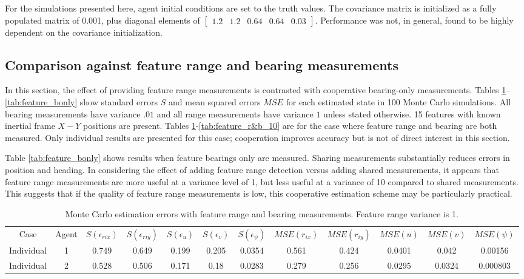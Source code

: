 \documentclass{aiaa-tc}
\begin{document}
For the simulations presented here, agent initial conditions are set to the truth values. The covariance matrix is initialized as a fully populated matrix of 0.001, plus diagonal elements of $\begin{bmatrix}1.2 & 1.2 & 0.64 & 0.64 & 0.03\end{bmatrix}$. Performance was not, in general, found to be highly dependent on the covariance initialization.

\subsection{Comparison against feature range and bearing measurements}\label{sec:subc1}

In this section, the effect of providing feature range measurements is contrasted with cooperative bearing-only measurements. Tables \ref{tab:feature_r&b}--\ref{tab:feature_bonly} show standard errors $S$ and mean squared errors $MSE$ for each estimated state in 100 Monte Carlo simulations. All bearing measurements have variance $.01$ and all range measurements have variance $1$ unless stated otherwise. 15 features with known inertial frame $X-Y$ positions are present. Tables \ref{tab:feature_r&b}-\ref{tab:feature_r&b_10} are for the case where feature range and bearing are both measured. Only individual results are presented for this case; cooperation improves accuracy but is not of direct interest in this section. 

Table \ref{tab:feature_bonly} shows results when feature bearings only are measured. Sharing measurements substantially reduces errors in position and heading. In considering the effect of adding feature range detection versus adding shared measurements, it appears that feature range measurements are more useful at a variance level of 1, but less useful at a variance of 10 compared to shared measurements. This suggests that if the quality of feature range measurements is low, this cooperative estimation scheme may be particularly practical.

\begin{table}[b!]
\scriptsize
\centering
\begin{tabular}{c|c|c|c|c|c|c|c|c|c|c|c|}
Case & Agent & $S(\epsilon_{rix})$ & $S(\epsilon_{riy})$ & $S(\epsilon_{u})$ & $S(\epsilon_{v})$ & $S(\epsilon_{\psi})$ & $MSE(r_{ix})$ & $MSE(r_{iy})$ & $MSE(u)$ & $MSE(v)$ & $MSE(\psi)$ \\
Individual & 1& 0.749& 0.649& 0.199& 0.205& 0.0354& 0.561& 0.424& 0.0401& 0.042& 0.00156 \\
Individual & 2& 0.528& 0.506& 0.171& 0.18& 0.0283& 0.279& 0.256& 0.0295& 0.0324& 0.000803
\end{tabular}
\caption{Monte Carlo estimation errors with feature range and bearing measurements. Feature range variance is 1.}
\label{tab:feature_r&b}
\end{table}
\end{document}
